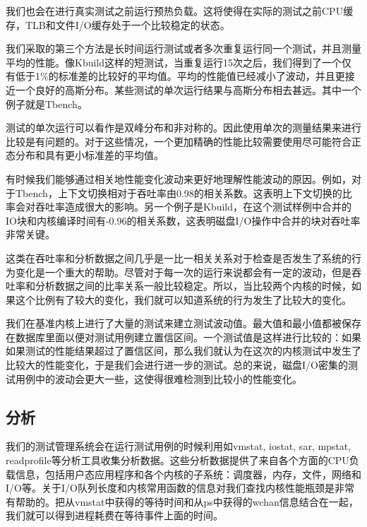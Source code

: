 我们也会在进行真实测试之前运行预热负载。这将使得在实际的测试之前CPU缓存，TLB和文件I/O缓存处于一个比较稳定的状态。

我们采取的第三个方法是长时间运行测试或者多次重复运行同一个测试，并且测量平均的性能。像Kbuild这样的短测试，当重复运行15次之后，我们得到了一个仅有低于1\%的标准差的比较好的平均值。平均的性能值已经减小了波动，并且更接近一个良好的高斯分布。某些测试的单次运行结果与高斯分布相去甚远。其中一个例子就是Tbench。

测试的单次运行可以看作是双峰分布和非对称的。因此使用单次的测量结果来进行比较是有问题的。对于这些情况，一个更加精确的性能比较需要使用尽可能符合正态分布和具有更小标准差的平均值。

有时候我们能够通过相关地性能变化波动来更好地理解性能波动的原因。例如，对于Tbench，上下文切换相对于吞吐率由0.98的相关系数。这表明上下文切换的比率会对吞吐率造成很大的影响。另一个例子是Kbuild，在这个测试样例中合并的IO块和内核编译时间有-0.96的相关系数，这表明磁盘I/O操作中合并的块对吞吐率非常关键。

这类在吞吐率和分析数据之间几乎是一比一相关关系对于检查是否发生了系统的行为变化是一个重大的帮助。尽管对于每一次的运行来说都会有一定的波动，但是吞吐率和分析数据之间的比率关系一般比较稳定。所以，当比较两个内核的时候，如果这个比例有了较大的变化，我们就可以知道系统的行为发生了比较大的变化。

我们在基准内核上进行了大量的测试来建立测试波动值。最大值和最小值都被保存在数据库里面以便对测试用例建立置信区间。一个测试值是这样进行比较的：如果如果测试的性能结果超过了置信区间，那么我们就认为在这次的内核测试中发生了比较大的性能变化，于是我们会进行进一步的测试。总的来说，磁盘I/O密集的测试用例中的波动会更大一些，这使得很难检测到比较小的性能变化。


\subsection{分析}
我们的测试管理系统会在运行测试用例的时候利用如vmstat, iostat, sar, mpstat, readprofile等分析工具收集分析数据。这些分析数据提供了来自各个方面的CPU负载信息，包括用户态应用程序和各个内核的子系统：调度器，内存，文件，网络和I/O等。关于I/O队列长度和内核常用函数的信息对我们查找内核性能瓶颈是非常有帮助的。把从vmstat中获得的等待时间和从ps中获得的wchan信息结合在一起，我们就可以得到进程耗费在等待事件上面的时间。


